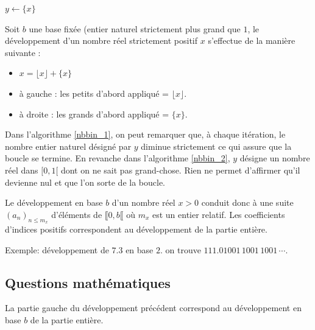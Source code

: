 \begin{algorithm}
  $y\longleftarrow \{ x \}$\;
  \caption{\`A droite: les grands d'abord.}
  \label{nbbin_2}
\end{algorithm}
Soit $b$ une base fixée (entier naturel strictement plus grand que $1$, le développement d'un nombre réel strictement positif $x$  s'effectue de la manière suivante :
\begin{itemize}
  \item $x = \lfloor x \rfloor + \{x\}$
  \item à gauche : \og les petits d'abord \fg appliqué = $\lfloor x \rfloor$.
  \item à droite : \og les grands d'abord \fg appliqué = $\{ x \}$.
\end{itemize}

Dans l'algorithme \ref{nbbin_1}, on peut remarquer que, à chaque itération, le nombre entier naturel désigné par $y$ diminue strictement ce qui assure que la boucle se termine. En revanche dans l'algorithme \ref{nbbin_2}, $y$ désigne un nombre réel dans $[0,1[$ dont on ne sait pas grand-chose. Rien ne permet d'affirmer qu'il devienne nul et que l'on sorte de la boucle. 

Le développement en base $b$ d'un nombre réel $x>0$ conduit donc à une suite $\left( a_n\right)_{n\leq m_x}$ d'éléments de $\llbracket 0 , b \llbracket$ où $m_x$ est un entier relatif. Les coefficients d'indices positifs correspondent au développement de la partie entière.


Exemple: développement de $7.3$ en base $2$. on trouve $111.01001\,1001\,1001\,\cdots$.

\subsection{Questions mathématiques}
La partie gauche du développement précédent correspond au développement en base $b$ de la partie entière.

